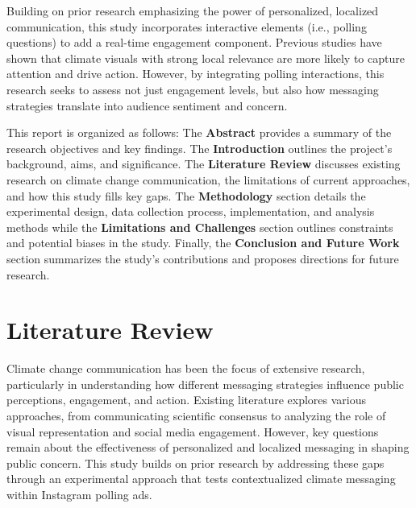 \documentclass[a4paper,11pt]{article}
\begin{document}
Building on prior research emphasizing the power of personalized, localized communication, this study incorporates interactive elements (i.e., polling questions) to add a real-time engagement component. Previous studies have shown that climate visuals with strong local relevance are more likely to capture attention and drive action. However, by integrating polling interactions, this research seeks to assess not just engagement levels, but also how messaging strategies translate into audience sentiment and concern.

This report is organized as follows: The \textbf{Abstract} provides a summary of the research objectives and key findings. The \textbf{Introduction} outlines the project’s background, aims, and significance. The \textbf{Literature Review} discusses existing research on climate change communication, the limitations of current approaches, and how this study fills key gaps. The \textbf{Methodology} section details the experimental design, data collection process, implementation, and analysis methods while the \textbf{Limitations and Challenges} section outlines constraints and potential biases in the study. Finally, the \textbf{Conclusion and Future Work} section summarizes the study’s contributions and proposes directions for future research.


\section{Literature Review}
Climate change communication has been the focus of extensive research, particularly in understanding how different messaging strategies influence public perceptions, engagement, and action. Existing literature explores various approaches, from communicating scientific consensus to analyzing the role of visual representation and social media engagement. However, key questions remain about the effectiveness of personalized and localized messaging in shaping public concern. This study builds on prior research by addressing these gaps through an experimental approach that tests contextualized climate messaging within Instagram polling ads.
\end{document}

